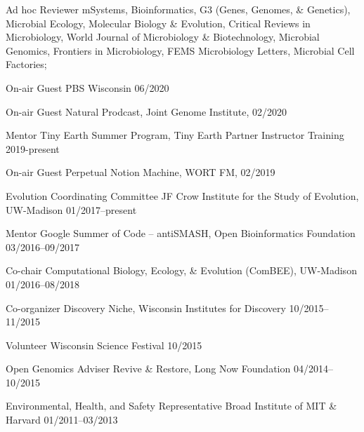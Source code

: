 

\begin{cvhonors}

\cvhonor
{Ad hoc Reviewer}
{mSystems, Bioinformatics, G3 (Genes, Genomes, \& Genetics), Microbial Ecology, Molecular Biology \& Evolution, Critical Reviews in Microbiology, World Journal of Microbiology \& Biotechnology, Microbial Genomics, Frontiers in Microbiology, FEMS Microbiology Letters, Microbial Cell Factories; \textbf{\textit{}}}
{}

\cvhonor
{On-air Guest}
{PBS Wisconsin}
{06/2020}

\cvhonor
{On-air Guest}
{Natural Prodcast, Joint Genome Institute, \textbf{\textit{}}}
{02/2020}

\cvhonor
{Mentor}
{Tiny Earth Summer Program, Tiny Earth Partner Instructor Training}
{2019-present}

\cvhonor
{On-air Guest}
{Perpetual Notion Machine, WORT FM, \textbf{\textit{}}}
{02/2019}

\cvhonor
{Evolution Coordinating Committee}
{JF Crow Institute for the Study of Evolution, UW-Madison}
{01/2017--present}

\cvhonor
{Mentor}
{Google Summer of Code -- antiSMASH, Open Bioinformatics Foundation}
{03/2016--09/2017}

\cvhonor
{Co-chair}
{Computational Biology, Ecology, \& Evolution (ComBEE), UW-Madison}
{01/2016--08/2018}

\cvhonor
{Co-organizer}
{Discovery Niche, Wisconsin Institutes for Discovery}
{10/2015--11/2015}

\cvhonor
{Volunteer}
{Wisconsin Science Festival}
{10/2015}

\cvhonor
{Open Genomics Adviser}
{Revive \& Restore, Long Now Foundation}
{04/2014--10/2015}

\cvhonor
{Environmental, Health, and Safety Representative}
{Broad Institute of MIT \& Harvard}
{01/2011--03/2013}

\end{cvhonors}